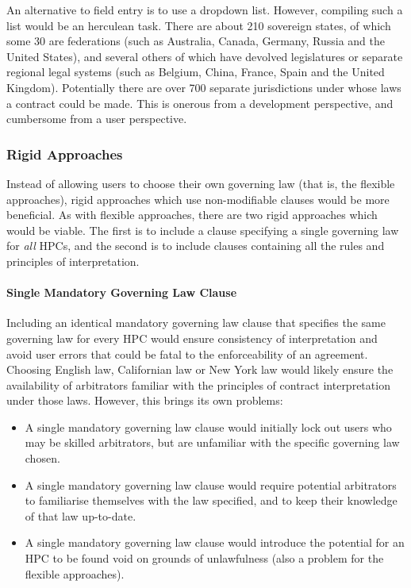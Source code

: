 \documentclass[a4paper,12pt]{article}
\begin{document}
An alternative to field entry is to use a dropdown list. However, compiling such a list would be an herculean task. There are about 210 sovereign states, of which some 30 are federations (such as Australia, Canada, Germany, Russia and the United States), and several others of which have devolved legislatures or separate regional legal systems (such as Belgium, China, France, Spain and the United Kingdom). Potentially there are over 700 separate jurisdictions under whose laws a contract could be made. This is onerous from a development perspective, and cumbersome from a user perspective.

\subsubsection{Rigid Approaches}

Instead of allowing users to choose their own governing law (that is, the flexible approaches), rigid approaches which use non-modifiable clauses would be more beneficial. As with flexible approaches, there are two rigid approaches which would be viable. The first is to include a clause specifying a single governing law for \textit{all} HPCs, and the second is to include clauses containing all the rules and principles of interpretation.

\paragraph{Single Mandatory Governing Law Clause}

Including an identical mandatory governing law clause that specifies the same governing law for every HPC would ensure consistency of interpretation and avoid user errors that could be fatal to the enforceability of an agreement. Choosing English law, Californian law or New York law would likely ensure the availability of arbitrators familiar with the principles of contract interpretation under those laws. However, this brings its own problems:

\begin{itemize}
	\item A single mandatory governing law clause would initially lock out users who may be skilled arbitrators, but are unfamiliar with the specific governing law chosen.
	\item A single mandatory governing law clause would require potential arbitrators to familiarise themselves with the law specified, and to keep their knowledge of that law up-to-date.
	\item A single mandatory governing law clause would introduce the potential for an HPC to be found void on grounds of unlawfulness (also a problem for the flexible approaches).
\end{itemize}
\end{document}
